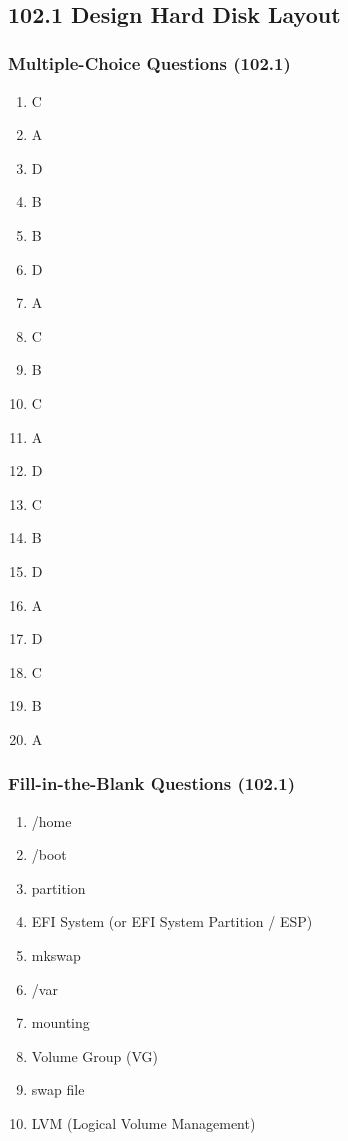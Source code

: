\documentclass[a4paper]{report}
\begin{document}
\
    
\subsection*{102.1  Design Hard Disk Layout}
\subsubsection*{Multiple-Choice Questions (102.1)}
\begin{enumerate}[1.]
    \item C
    \item A
    \item D
    \item B
    \item B
    \item D
    \item A
    \item C
    \item B
    \item C
    \item A
    \item D
    \item C
    \item B
    \item D
    \item A
    \item D
    \item C
    \item B
    \item A
\end{enumerate}


\subsubsection*{Fill-in-the-Blank Questions (102.1)}
\begin{enumerate}[1.]
    \item /home
    \item /boot
    \item partition
    \item EFI System (or EFI System Partition / ESP)
    \item mkswap
    \item /var
    \item mounting
    \item Volume Group (VG)
    \item swap file
    \item LVM (Logical Volume Management)
\end{enumerate}
\end{document}
